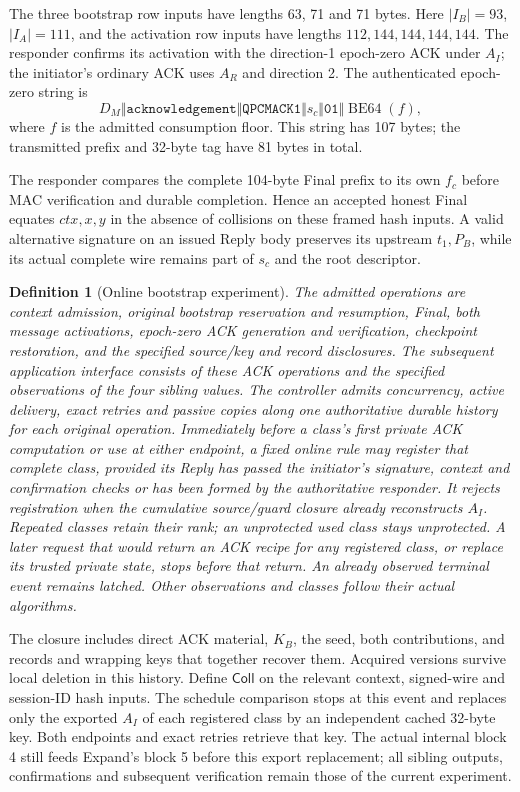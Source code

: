 \documentclass[pdflatex]{sn-jnl}
\theoremstyle{thmstyleone}
\theoremstyle{thmstylethree}
\newtheorem{definition}[theorem]{Definition}
\theoremstyle{thmstyletwo}
\begin{document}
The three bootstrap row inputs have lengths 63, 71 and 71 bytes.
Here $|I_B|=93$, $|I_A|=111$, and the activation row inputs have
lengths $112,144,144,144,144$. The responder confirms its activation
with the direction-1 epoch-zero ACK under $A_I$; the initiator's ordinary
ACK uses $A_R$ and direction 2. The authenticated epoch-zero string is
\[
 D_M\Vert\texttt{acknowledgement}\Vert\mathtt{QPCMACK1}
       \Vert s_c\Vert\mathtt{01}\Vert\operatorname{BE64}(f),
\]
where $f$ is the admitted consumption floor. This string has 107 bytes;
the transmitted prefix and 32-byte tag have 81 bytes in total.

The responder compares the complete 104-byte Final prefix to its own
$f_c$ before MAC verification and durable completion. Hence an accepted
honest Final equates $\mathit{ctx},x,y$ in the absence of collisions
on these framed hash inputs. A valid alternative signature on an issued
Reply body preserves its upstream $t_1,P_B$, while its actual complete
wire remains part of $s_c$ and the root descriptor.

\begin{definition}[Online bootstrap experiment]
\label{def:bootstrap-online}
The admitted operations are context admission, original bootstrap
reservation and resumption, Final, both message activations, epoch-zero
ACK generation and verification, checkpoint restoration, and the
specified source/key and record disclosures. The subsequent application
interface consists of these ACK operations and the specified observations
of the four sibling values. The controller admits concurrency, active
delivery, exact retries and passive copies along one authoritative
durable history for each original operation. Immediately before a class's
first private ACK computation or use at either endpoint, a fixed online rule
may register that complete class, provided its Reply has passed the
initiator's signature, context and confirmation checks or has been formed
by the authoritative responder. It rejects registration when the
cumulative source/guard closure already reconstructs $A_I$. Repeated
classes retain their rank; an unprotected used class stays unprotected.
A later request that would return an ACK recipe for any registered class,
or replace its trusted private state, stops before that return. An already
observed terminal event remains latched. Other observations and classes
follow their actual algorithms.
\end{definition}

The closure includes direct ACK material, $K_B$, the seed, both
contributions, and records and wrapping keys that together recover them.
Acquired versions survive local deletion in this history. Define
$\mathsf{Coll}$ on the relevant context, signed-wire and session-ID
hash inputs. The schedule comparison stops at this event and replaces
only the exported $A_I$ of each registered class by an independent cached
32-byte key. Both endpoints and exact retries retrieve that key.
The actual internal block 4 still feeds Expand's block 5 before this
export replacement; all sibling outputs, confirmations and subsequent
verification remain those of the current experiment.
\end{document}
